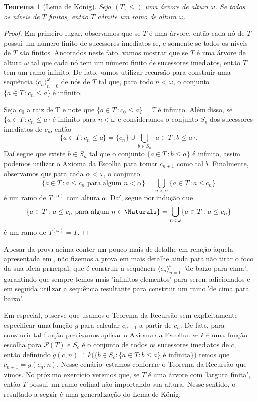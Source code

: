 \documentclass[a4paper]{article}
\theoremstyle{plain}\newtheorem{teo}{Teorema}[section]
\begin{document}
  \begin{teo}[Lema de König]
  Seja \((T,\leq)\) uma árvore de altura \(\omega\). Se todos os níveis de \(T\) finitos, então
  \(T\) admite um ramo de altura \(\omega\).
  \end{teo}
\begin{proof}
  Em primeiro lugar, observamos que se  \(T\) é uma árvore, então cada nó de \(T\) possui
  um número finito de sucessores imediatos se, e somente se todos os níveis de
  \(T\) são finitos. Ancorados neste fato, vamos mostrar que se \(T\) é uma
  árvore de altura \(\omega\) tal que cada nó tem um número finito de sucessores
  imediatos,  então \(T\) tem um ramo infinito. De fato, vamos utilizar recursão
  para  construir uma sequência \(\langle c_n\rangle_{n=0}^{\omega}\)  de nós de \(T\) tal que,
  para todo \(n<\omega\), o conjunto \(\{a\in T\,\colon c_n\leq a\}\) é
  infinito.

  Seja \(c_0\) a raiz de T e  note que \(\{a \in T\,\colon c_{0} \leq a \}= T\)
  é infinito. Além disso, se \(\{a\in T\,\colon c_n\leq a\}\) é infinito para
  \(n<\omega\) e consideramos  o
  conjunto \(S_n\) dos sucessores imediatos de \(c_n\), então
  \[
  \{a\in T\,\colon c_n\leq a\} = \{c_n\} \cup\bigcup_{b\in S_n} \{a\in T\,\colon b\leq a\}.
  \]
 Daí segue que existe \(b\in S_n\) tal que o conjunto \(\{a\in T\,\colon
 b\leq a\}\) é infinito, assim podemos utilizar o Axioma da Escolha para
 tomar \(c_{n+1}\) como tal \(b\). 
 Finalmente, observamos que para cada \(\alpha<\omega\), o conjunto
 \[\{a\in T\,\colon  a\leq c_n \text{ para algum }
   n<\alpha\}=\bigcup_{n<\alpha}\{a\in T\,\colon a\leq c_n\}\] é
  um ramo de \(T^{(\alpha)}\) com altura \(\alpha\). Daí,
  segue por indução que \[\{a\in T\,\colon a\leq c_n \text{ para algum }
    n\in\Naturals\}=\bigcup_{n <\omega}\{a\in T\,\colon a\leq c_n\}\]
  é um ramo de \(T^{(\omega)}=T\).
  \end{proof}

    Apesar da prova acima conter um pouco mais de detalhe em relação àquela
    apresentada em \cite{jech}, não fizemos a prova em mais detalhe ainda para
    não tirar o foco da sua ideia principal, que é construir a sequência
    \(\langle c_n\rangle_{n=0}^\omega\) 'de baixo para cima', garantindo que
    sempre temos mais 'infinitos elementos' para serem adicionados e em seguida
    utilizar a sequência resultante para construir um ramo 'de cima para baixo'.

    Em especial, observe que usamos o Teorema da Recursão sem
    explicitamente especificar uma função \(g\) para
    calcular \(c_{n+1}\) a partir de \(c_n\). De fato, para consturir tal função precisamos
    aplicar o Axioma da Escolha: se \(k\) é uma função escolha para
    \(\mathcal{P}(T)\) e \(S_c\) é o conjunto de todos os sucessores imediatos
    de \(c\), então definindo \(g(c,n) \doteq k\big ( \{b\in S_c: \{a\in T: b\leq a\} \text{ é
      infinita}\}\big )\) temos que \(c_{n+1} = g(c_n, n)\). Nesse cenário, estamos
    conforme o Teorema da Recursão que vimos. No próximo exercício veremos que,
    se \(T\) é uma árvore com 'largura finita', então \(T\) possui um ramo
    cofinal não importando sua altura. Nesse sentido, o resultado a seguir é uma
    generalização do Lema de König.
  
\end{document}

